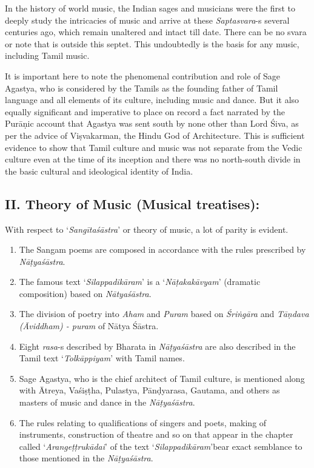 In the history of world music, the Indian sages and musicians were the first to deeply study the intricacies of music and arrive at these \textit{Saptasvara}-s several centuries ago, which remain unaltered and intact till date. There can be no svara or note that is outside this septet. This undoubtedly is the basis for any music, including Tamil music.

It is important here to note the phenomenal contribution and role of Sage Agastya, who is considered by the Tamils as the founding father of Tamil language and all elements of its culture, including music and dance. But it also equally significant and imperative to place on record a fact narrated by the Purāṇic account that Agastya was sent south by none other than Lord Śiva, as per the advice of Viṣvakarman, the Hindu God of Architecture. This is sufficient evidence to show that Tamil culture and music was not separate from the Vedic culture even at the time of its inception and there was no north-south divide in the basic cultural and ideological identity of India.


\subsection*{II. Theory of Music (Musical treatises):}

With respect to ‘\textit{Sangītaśāstra}’ or theory of music, a lot of parity is evident.

\begin{enumerate}[{\rm 1.}]
\itemsep=0pt
\item The Sangam poems are composed in accordance with the rules prescribed by \textit{Nāṭyaśāstra}.

 \item The famous text ‘\textit{Silappadikāram}’ is a ‘\textit{Nāṭakakāvyam}’ (dramatic composition) based on \textit{Nātyaśāstra}.

 \item The division of poetry into \textit{Aham} and \textit{Puram} based on \textit{Śriṅgāra} and \textit{Tāṇdava (Āviddham) - puram} of Nātya Śāstra.

 \item Eight \textit{rasa}-s described by Bharata in \textit{Nāṭyaśāstra }are also described in the Tamil text ‘\textit{Tolkāppiyam}’ with Tamil names.

 \item Sage Agastya, who is the chief architect of Tamil culture, is mentioned along with Ātreya, Vaśiṣṭha, Pulastya, Pānḍyarasa, Gautama, and others as masters of music and dance in the \textit{Nāṭyaśāstra}.

 \item The rules relating to qualifications of singers and poets, making of instruments, construction of theatre and so on that appear in the chapter called ‘\textit{Arangeṭṭrukādai}’ of the text ‘\textit{Silappadikāram}’bear exact semblance to those mentioned in the \textit{Nāṭyaśāstra}.

\end{enumerate}

